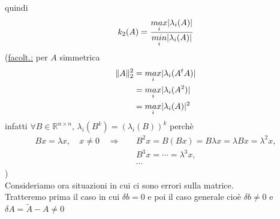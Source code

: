 \documentclass[12pt,a4paper]{article}
\DeclarePairedDelimiter{\abs}{\lvert}{\rvert}
\DeclarePairedDelimiter{\norma}{\lVert}{\rVert}
\begin{document}
quindi
\[
k_2 (A) = \frac{\underset{i}{max} \abs{\lambda_i (A)}}{\underset{i}{min} \abs{\lambda_i (A)}}
\]
(\uline{facolt.:} per $A$ simmetrica
\begin{align*}
    \norma{A}_2^2 &= \underset{i}{max} \abs{\lambda_i (A^tA)} \\
    &= \underset{i}{max} \abs{\lambda_i (A^2)} \\
    &= \underset{i}{max} \abs{\lambda_i (A)}^2 \\
\end{align*}
infatti $\forall B \in \mathbb{R}^{n \times n}$, $\lambda_i(B^k) = (\lambda_i(B))^k$ perchè
\begin{align*}
    Bx = \lambda x, \quad x \neq 0 \quad \Rightarrow \quad & B^2x = B(Bx) =  B \lambda x = \lambda Bx = \lambda^2x, \\
    & B^3x = \cdots =  \lambda^3x, \\
    & \cdots
\end{align*})\\
Consideriamo ora situazioni in cui ci sono errori sulla matrice.\\
Tratteremo prima il caso in cui $\delta b = 0$ e poi il caso generale cioè $\delta b \neq 0$ e $\delta A = \tilde{A} - A \neq 0$
\end{document}
